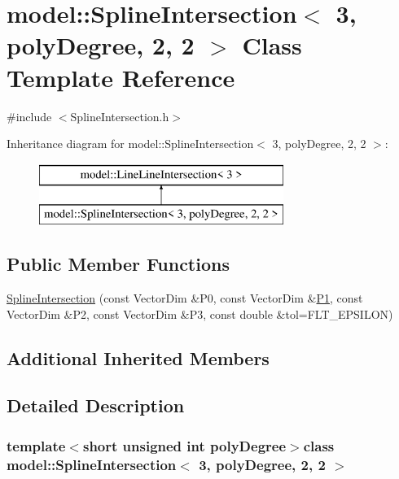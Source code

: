 \hypertarget{classmodel_1_1_spline_intersection_3_013_00_01poly_degree_00_012_00_012_01_4}{}\section{model\+:\+:Spline\+Intersection$<$ 3, poly\+Degree, 2, 2 $>$ Class Template Reference}
\label{classmodel_1_1_spline_intersection_3_013_00_01poly_degree_00_012_00_012_01_4}


{\ttfamily \#include $<$Spline\+Intersection.\+h$>$}

Inheritance diagram for model\+:\+:Spline\+Intersection$<$ 3, poly\+Degree, 2, 2 $>$\+:\begin{figure}[H]
\begin{center}
\leavevmode
\includegraphics[height=2.000000cm]{classmodel_1_1_spline_intersection_3_013_00_01poly_degree_00_012_00_012_01_4}
\end{center}
\end{figure}
\subsection*{Public Member Functions}
\begin{DoxyCompactItemize}
\item 
\hyperlink{classmodel_1_1_spline_intersection_3_013_00_01poly_degree_00_012_00_012_01_4_af0c32c4b19a68ba2365d566c558dc8be}{Spline\+Intersection} (const Vector\+Dim \&P0, const Vector\+Dim \&\hyperlink{run_multipole_8m_af93dd7f73e57b8b17d34efa33f0f948e}{P1}, const Vector\+Dim \&P2, const Vector\+Dim \&P3, const double \&tol=F\+L\+T\+\_\+\+E\+P\+S\+I\+L\+O\+N)
\end{DoxyCompactItemize}
\subsection*{Additional Inherited Members}


\subsection{Detailed Description}
\subsubsection*{template$<$short unsigned int poly\+Degree$>$class model\+::\+Spline\+Intersection$<$ 3, poly\+Degree, 2, 2 $>$}



